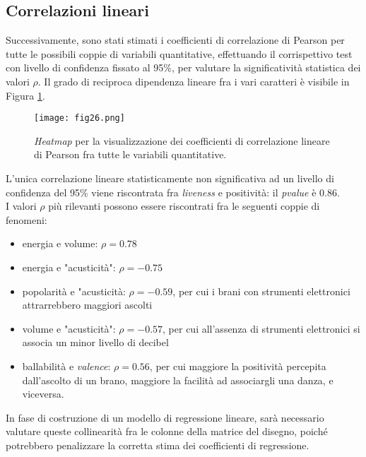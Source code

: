 \documentclass[fleqn,10pt]{SelfArx} %
\begin{document}
\subsection{Correlazioni lineari}\label{corr}
Successivamente, sono stati stimati i coefficienti di correlazione di Pearson per tutte le possibili coppie di variabili quantitative, effettuando il corrispettivo test con livello di confidenza fissato al 95\%, per valutare la significatività statistica dei valori $\rho$. Il grado di reciproca dipendenza lineare fra i vari caratteri è visibile in Figura \ref{fig:fig26}.
\begin{figure}[H]
    \centering
    \texttt{[image: fig26.png]}
    \caption{\textit{Heatmap} per la visualizzazione dei coefficienti di correlazione lineare di Pearson fra tutte le variabili quantitative.}
    \label{fig:fig26}
\end{figure}
L'unica correlazione lineare statisticamente non significativa ad un livello di confidenza del 95\% viene riscontrata fra \textit{liveness} e positività: il \textit{pvalue} è 0.86.\\
I valori $\rho$ più rilevanti possono essere riscontrati fra le seguenti coppie di fenomeni:
\begin{itemize}
    \item energia e volume: $\rho=0.78$ 
    \item energia e "acusticità": $\rho=-0.75$
    \item popolarità e "acusticità: $\rho=-0.59$, per cui i brani con strumenti elettronici attrarrebbero maggiori ascolti
    \item volume e "acusticità": $\rho=-0.57$, per cui all'assenza di strumenti elettronici si associa un minor livello di decibel
    \item ballabilità e \textit{valence}: $\rho=0.56$, per cui maggiore la positività percepita dall'ascolto di un brano, maggiore la facilità ad associargli una danza, e viceversa. 
\end{itemize}
In fase di costruzione di un modello di regressione lineare, sarà necessario valutare queste collinearità fra le colonne della matrice del disegno, poiché potrebbero penalizzare la corretta stima dei coefficienti di regressione.
\end{document}

